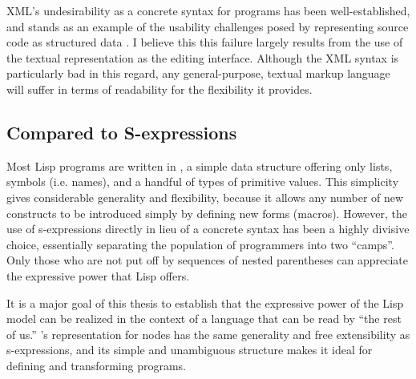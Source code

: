 XML's undesirability as a concrete syntax for programs has been well-established, and stands as an example of the usability challenges posed by representing source code as structured data \cite{holub}\cite{xml-bad-ant}. I believe this this failure largely results from the use of the textual representation as the editing interface. Although the XML syntax is particularly bad in this regard, any general-purpose, textual markup language will suffer in terms of readability for the flexibility it provides.

\subsection{Compared to S-expressions}
Most Lisp programs are written in , a simple data structure offering only lists, symbols (i.e. names), and a handful of types of primitive values. This simplicity gives considerable generality and flexibility, because it allows any number of new constructs to be introduced simply by defining new forms (macros). However, the use of s-expressions directly in lieu of a concrete syntax has been a highly divisive choice, essentially separating the population of programmers into two ``camps''. Only those who are not put off by sequences of nested parentheses can appreciate the expressive power that Lisp offers.

It is a major goal of this thesis to establish that the expressive power of the Lisp model can be realized in the context of a language that can be read by ``the rest of us.'' \Meta's representation for nodes has the same generality and free extensibility as s-expressions, and its simple and unambiguous structure makes it ideal for defining and transforming programs.


